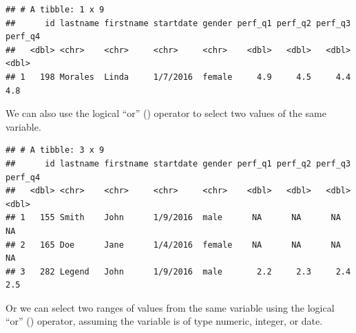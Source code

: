 \documentclass[]{book}
\newenvironment{Shaded}{\begin{snugshade}}{\end{snugshade}}
\newcommand{\KeywordTok}[1]{\textcolor[rgb]{0.13,0.29,0.53}{\textbf{#1}}}
\newcommand{\FloatTok}[1]{\textcolor[rgb]{0.00,0.00,0.81}{#1}}
\newcommand{\StringTok}[1]{\textcolor[rgb]{0.31,0.60,0.02}{#1}}
\newcommand{\CommentTok}[1]{\textcolor[rgb]{0.56,0.35,0.01}{\textit{#1}}}
\newcommand{\OperatorTok}[1]{\textcolor[rgb]{0.81,0.36,0.00}{\textbf{#1}}}
\newcommand{\NormalTok}[1]{#1}
\begin{document}
\begin{verbatim}
## # A tibble: 1 x 9
##      id lastname firstname startdate gender perf_q1 perf_q2 perf_q3 perf_q4
##   <dbl> <chr>    <chr>     <chr>     <chr>    <dbl>   <dbl>   <dbl>   <dbl>
## 1   198 Morales  Linda     1/7/2016  female     4.9     4.5     4.4     4.8
\end{verbatim}

We can also use the logical ``or'' (\texttt{\textbar{}}) operator to
select two values of the same variable.

\begin{Shaded}
\end{Shaded}

\begin{verbatim}
## # A tibble: 3 x 9
##      id lastname firstname startdate gender perf_q1 perf_q2 perf_q3 perf_q4
##   <dbl> <chr>    <chr>     <chr>     <chr>    <dbl>   <dbl>   <dbl>   <dbl>
## 1   155 Smith    John      1/9/2016  male      NA      NA      NA      NA  
## 2   165 Doe      Jane      1/4/2016  female    NA      NA      NA      NA  
## 3   282 Legend   John      1/9/2016  male       2.2     2.3     2.4     2.5
\end{verbatim}

Or we can select two ranges of values from the same variable using the
logical ``or'' (\texttt{\textbar{}}) operator, assuming the variable is
of type numeric, integer, or date.

\begin{Shaded}
\end{Shaded}
\end{document}
